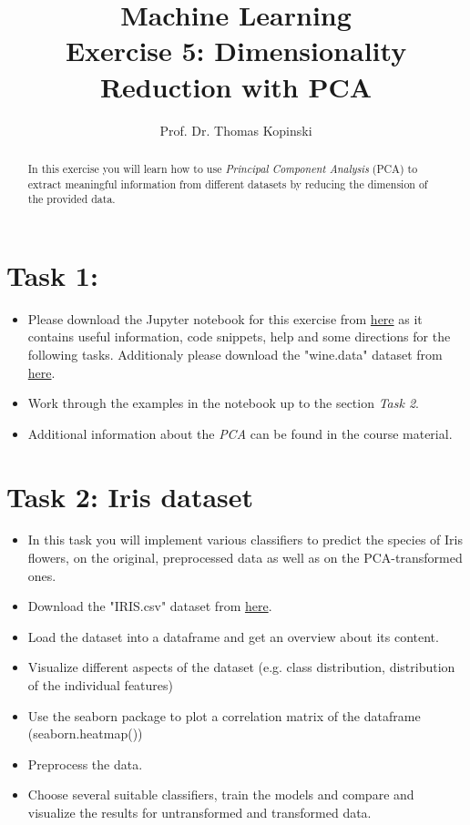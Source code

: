 \documentclass{article}
\title{Machine Learning \\ Exercise 5: Dimensionality Reduction with PCA}
\author{Prof. Dr. Thomas Kopinski}
\begin{document}
\maketitle

\begin{abstract}
In this exercise you will learn how to use \emph{Principal Component Analysis} (PCA) to extract meaningful information from different datasets by reducing the dimension of the provided data.
\end{abstract}

\section*{Task 1:}
\begin{itemize}
    \item Please download the Jupyter notebook for this exercise from \href{https://github.com/DataScienceLabFHSWF/MachineLearningCourse/tree/main/exercises/05}{here} as it contains useful information, code snippets, help and some directions for the following tasks. Additionaly please download the "wine.data" dataset from \href{https://github.com/DataScienceLabFHSWF/MachineLearningCourse/tree/main/data/05}{here}. 
    \item Work through the examples in the notebook up to the section \emph{Task 2}. 
    \item Additional information about the \emph{PCA} can be found in the course material.
\end{itemize}

\section*{Task 2: Iris dataset}
\begin{itemize}
    \item In this task you will implement various classifiers to predict the species of Iris flowers, on the original, preprocessed data as well as on the PCA-transformed ones.
    \item Download the "IRIS.csv" dataset from \href{https://github.com/DataScienceLabFHSWF/MachineLearningCourse/tree/main/data/05}{here}.
    \item Load the dataset into a dataframe and get an overview about its content.
    \item Visualize different aspects of the dataset (e.g. class distribution, distribution of the individual features)
    \item Use the seaborn package to plot a correlation matrix of the dataframe (seaborn.heatmap())
    \item Preprocess the data.
    \item Choose several suitable classifiers, train the models and compare and visualize the results for untransformed and transformed data.
\end{itemize}
\end{document}
